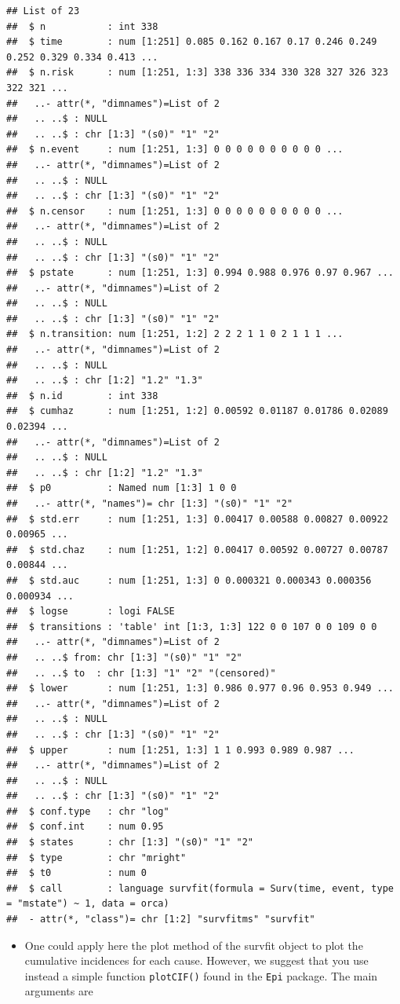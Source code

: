 \documentclass[
]{book}
\providecommand{\tightlist}{%
  \setlength{\itemsep}{0pt}\setlength{\parskip}{0pt}}
\begin{document}
\begin{verbatim}
## List of 23
##  $ n           : int 338
##  $ time        : num [1:251] 0.085 0.162 0.167 0.17 0.246 0.249 0.252 0.329 0.334 0.413 ...
##  $ n.risk      : num [1:251, 1:3] 338 336 334 330 328 327 326 323 322 321 ...
##   ..- attr(*, "dimnames")=List of 2
##   .. ..$ : NULL
##   .. ..$ : chr [1:3] "(s0)" "1" "2"
##  $ n.event     : num [1:251, 1:3] 0 0 0 0 0 0 0 0 0 0 ...
##   ..- attr(*, "dimnames")=List of 2
##   .. ..$ : NULL
##   .. ..$ : chr [1:3] "(s0)" "1" "2"
##  $ n.censor    : num [1:251, 1:3] 0 0 0 0 0 0 0 0 0 0 ...
##   ..- attr(*, "dimnames")=List of 2
##   .. ..$ : NULL
##   .. ..$ : chr [1:3] "(s0)" "1" "2"
##  $ pstate      : num [1:251, 1:3] 0.994 0.988 0.976 0.97 0.967 ...
##   ..- attr(*, "dimnames")=List of 2
##   .. ..$ : NULL
##   .. ..$ : chr [1:3] "(s0)" "1" "2"
##  $ n.transition: num [1:251, 1:2] 2 2 2 1 1 0 2 1 1 1 ...
##   ..- attr(*, "dimnames")=List of 2
##   .. ..$ : NULL
##   .. ..$ : chr [1:2] "1.2" "1.3"
##  $ n.id        : int 338
##  $ cumhaz      : num [1:251, 1:2] 0.00592 0.01187 0.01786 0.02089 0.02394 ...
##   ..- attr(*, "dimnames")=List of 2
##   .. ..$ : NULL
##   .. ..$ : chr [1:2] "1.2" "1.3"
##  $ p0          : Named num [1:3] 1 0 0
##   ..- attr(*, "names")= chr [1:3] "(s0)" "1" "2"
##  $ std.err     : num [1:251, 1:3] 0.00417 0.00588 0.00827 0.00922 0.00965 ...
##  $ std.chaz    : num [1:251, 1:2] 0.00417 0.00592 0.00727 0.00787 0.00844 ...
##  $ std.auc     : num [1:251, 1:3] 0 0.000321 0.000343 0.000356 0.000934 ...
##  $ logse       : logi FALSE
##  $ transitions : 'table' int [1:3, 1:3] 122 0 0 107 0 0 109 0 0
##   ..- attr(*, "dimnames")=List of 2
##   .. ..$ from: chr [1:3] "(s0)" "1" "2"
##   .. ..$ to  : chr [1:3] "1" "2" "(censored)"
##  $ lower       : num [1:251, 1:3] 0.986 0.977 0.96 0.953 0.949 ...
##   ..- attr(*, "dimnames")=List of 2
##   .. ..$ : NULL
##   .. ..$ : chr [1:3] "(s0)" "1" "2"
##  $ upper       : num [1:251, 1:3] 1 1 0.993 0.989 0.987 ...
##   ..- attr(*, "dimnames")=List of 2
##   .. ..$ : NULL
##   .. ..$ : chr [1:3] "(s0)" "1" "2"
##  $ conf.type   : chr "log"
##  $ conf.int    : num 0.95
##  $ states      : chr [1:3] "(s0)" "1" "2"
##  $ type        : chr "mright"
##  $ t0          : num 0
##  $ call        : language survfit(formula = Surv(time, event, type = "mstate") ~ 1, data = orca)
##  - attr(*, "class")= chr [1:2] "survfitms" "survfit"
\end{verbatim}

\begin{itemize}
\tightlist
\item
  One could apply here the plot method of the survfit object to plot the
  cumulative incidences for each cause. However, we suggest that you use
  instead a simple function \texttt{plotCIF()} found in the \texttt{Epi} package.
  The main arguments are
\end{itemize}
\end{document}
